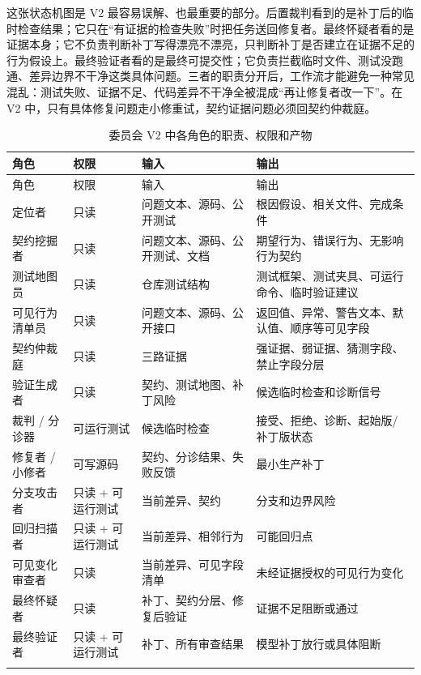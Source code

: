 \documentclass[UTF8,a4paper,11pt]{ctexart}
\begin{document}
这张状态机图是 V2 最容易误解、也最重要的部分。后置裁判看到的是补丁后的临时检查结果；它只在“有证据的检查失败”时把任务送回修复者。最终怀疑者看的是证据本身；它不负责判断补丁写得漂亮不漂亮，只判断补丁是否建立在证据不足的行为假设上。最终验证者看的是最终可提交性；它负责拦截临时文件、测试没跑通、差异边界不干净这类具体问题。三者的职责分开后，工作流才能避免一种常见混乱：测试失败、证据不足、代码差异不干净全被混成“再让修复者改一下”。在 V2 中，只有具体修复问题走小修重试，契约证据问题必须回契约仲裁庭。

\begin{center}
{\small
\setlength{\tabcolsep}{3pt}
\begin{longtable}{L{2.8cm} L{2.3cm} L{4.5cm} L{4.7cm}}
\toprule
角色 & 权限 & 输入 & 输出 \\
\midrule
\endfirsthead
\toprule
角色 & 权限 & 输入 & 输出 \\
\midrule
\endhead
定位者 & 只读 & 问题文本、源码、公开测试 & 根因假设、相关文件、完成条件 \\
契约挖掘者 & 只读 & 问题文本、源码、公开测试、文档 & 期望行为、错误行为、无影响行为契约 \\
测试地图员 & 只读 & 仓库测试结构 & 测试框架、测试夹具、可运行命令、临时验证建议 \\
可见行为清单员 & 只读 & 问题文本、源码、公开接口 & 返回值、异常、警告文本、默认值、顺序等可见字段 \\
契约仲裁庭 & 只读 & 三路证据 & 强证据、弱证据、猜测字段、禁止字段分层 \\
验证生成者 & 只读 & 契约、测试地图、补丁风险 & 候选临时检查和诊断信号 \\
裁判 / 分诊器 & 可运行测试 & 候选临时检查 & 接受、拒绝、诊断、起始版/补丁版状态 \\
修复者 / 小修者 & 可写源码 & 契约、分诊结果、失败反馈 & 最小生产补丁 \\
分支攻击者 & 只读 + 可运行测试 & 当前差异、契约 & 分支和边界风险 \\
回归扫描者 & 只读 + 可运行测试 & 当前差异、相邻行为 & 可能回归点 \\
可见变化审查者 & 只读 & 当前差异、可见字段清单 & 未经证据授权的可见行为变化 \\
最终怀疑者 & 只读 & 补丁、契约分层、修复后验证 & 证据不足阻断或通过 \\
最终验证者 & 只读 + 可运行测试 & 补丁、所有审查结果 & 模型补丁放行或具体阻断 \\
\bottomrule
\caption{委员会 V2 中各角色的职责、权限和产物}
\end{longtable}
}
\end{center}
\end{document}
